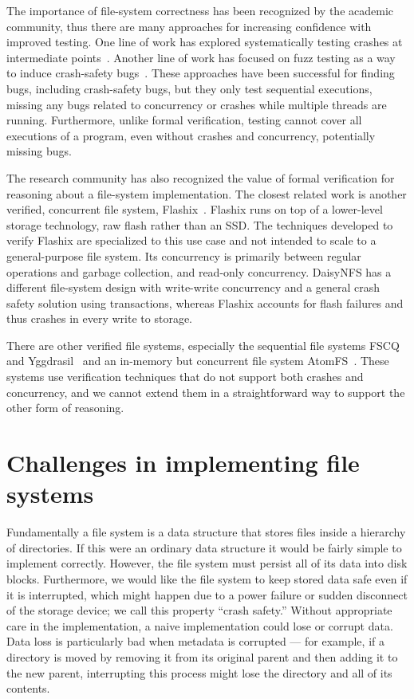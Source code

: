 The importance of file-system correctness has been recognized by the academic
community, thus there are many approaches for increasing confidence with
improved testing. One line of work has explored systematically testing crashes
at intermediate points~\cite{mohan:crashmonkey,pillai:appcrash}. Another line of
work has focused on fuzz testing as a way to induce crash-safety
bugs~\cite{xu:janus,kim:hydra}. These approaches have been successful for
finding bugs, including crash-safety bugs, but they only test sequential
executions, missing any bugs related to concurrency or crashes while multiple
threads are running. Furthermore, unlike formal verification, testing cannot
cover all executions of a program, even without crashes and concurrency,
potentially missing bugs.

The research community has also recognized the value of formal verification for
reasoning about a file-system implementation. The closest related work is
another verified, concurrent file system,
Flashix~\cite{bodenmuller:concurrent-flashix}. Flashix runs on top of a
lower-level storage technology, raw flash rather than an SSD. The techniques
developed to verify Flashix are specialized to this use case and not intended to
scale to a general-purpose file system. Its concurrency is primarily between
regular operations and garbage collection, and read-only concurrency. DaisyNFS
has a different file-system design with write-write concurrency and a general
crash safety solution using transactions, whereas Flashix accounts for flash
failures and thus crashes in every write to storage.

There are other verified file systems, especially the sequential file systems
FSCQ~\cite{chen:fscq} and Yggdrasil~\cite{sigurbjarnarson:yggdrasil} and an
in-memory but concurrent file system AtomFS~\cite{zou:atomfs}. These systems use
verification techniques that do not support both crashes and concurrency, and we
cannot extend them in a straightforward way to support the other form of reasoning.

\section{Challenges in implementing file systems}

Fundamentally a file system is a data structure that stores files inside a
hierarchy of directories. If this were an ordinary data structure it would be
fairly simple to implement correctly. However, the file system must persist all
of its data into disk blocks. Furthermore, we would like the file system to keep
stored data safe even if it is interrupted, which might happen due to a power
failure or sudden disconnect of the storage device; we call this property
``crash safety.'' Without appropriate care in the implementation, a naive
implementation could lose or corrupt data. Data loss is particularly bad when
metadata is corrupted --- for example, if a directory is moved by removing it
from its original parent and then adding it to the new parent, interrupting this
process might lose the directory and all of its contents.

